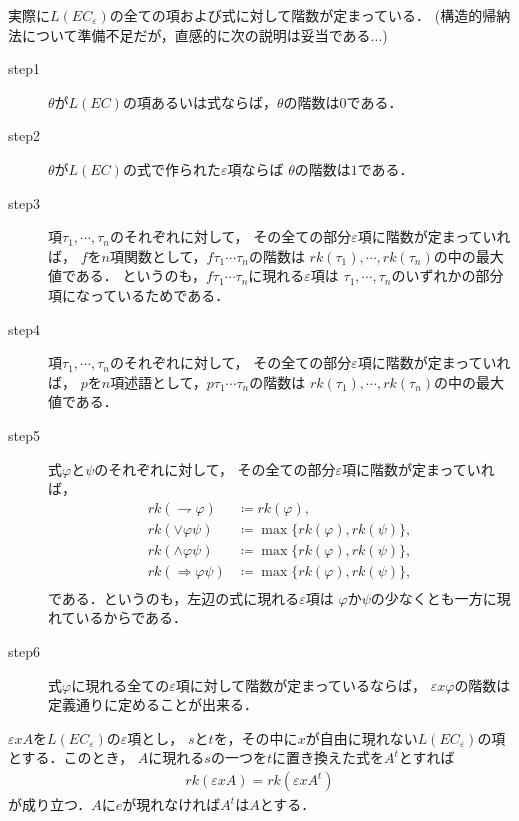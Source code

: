 	実際に$L(EC_{\varepsilon})$の全ての項および式に対して階数が定まっている．
	(構造的帰納法について準備不足だが，直感的に次の説明は妥当である...)
	\begin{description}
		\item[step1] $\theta$が$L(EC)$の項あるいは式ならば，$\theta$の階数は$0$である．
		
		\item[step2] $\theta$が$L(EC)$の式で作られた$\varepsilon$項ならば
			$\theta$の階数は$1$である．
		
		\item[step3] 項$\tau_{1},\cdots,\tau_{n}$のそれぞれに対して，
			その全ての部分$\varepsilon$項に階数が定まっていれば，
			$f$を$n$項関数として，$f\tau_{1}\cdots\tau_{n}$の階数は
			$rk(\tau_{1}),\cdots,rk(\tau_{n})$の中の最大値である．
			というのも，$f\tau_{1}\cdots\tau_{n}$に現れる$\varepsilon$項は
			$\tau_{1},\cdots,\tau_{n}$のいずれかの部分項になっているためである．
			
		\item[step4] 項$\tau_{1},\cdots,\tau_{n}$のそれぞれに対して，
			その全ての部分$\varepsilon$項に階数が定まっていれば，
			$p$を$n$項述語として，$p\tau_{1}\cdots\tau_{n}$の階数は
			$rk(\tau_{1}),\cdots,rk(\tau_{n})$の中の最大値である．
		
		\item[step5] 式$\varphi$と$\psi$のそれぞれに対して，
			その全ての部分$\varepsilon$項に階数が定まっていれば，
			\begin{align}
				rk(\rightharpoondown \varphi) &\coloneqq rk(\varphi), \\
				rk(\vee \varphi \psi) &\coloneqq \max\{rk(\varphi),rk(\psi)\}, \\
				rk(\wedge \varphi \psi) &\coloneqq \max\{rk(\varphi),rk(\psi)\}, \\
				rk(\Longrightarrow \varphi \psi) 
				&\coloneqq \max\{rk(\varphi),rk(\psi)\}, \\
			\end{align}
			である．というのも，左辺の式に現れる$\varepsilon$項は
			$\varphi$か$\psi$の少なくとも一方に現れているからである．
		
		\item[step6] 式$\varphi$に現れる全ての$\varepsilon$項に対して階数が定まっているならば，
			$\varepsilon x \varphi$の階数は定義通りに定めることが出来る．
	\end{description}
	
	\begin{screen}
		\begin{metathm}[階数定理]
			$\varepsilon x A$を$L(EC_{\varepsilon})$の$\varepsilon$項とし，
			$s$と$t$を，その中に$x$が自由に現れない$L(EC_{\varepsilon})$の項とする．このとき，
			$A$に現れる$s$の一つを$t$に置き換えた式を$A^{t}$とすれば
			\begin{align}
				rk(\varepsilon x A) = rk(\varepsilon x A^{t})
			\end{align}
			が成り立つ．$A$に$e$が現れなければ$A^{t}$は$A$とする．
		\end{metathm}
	\end{screen}
	
